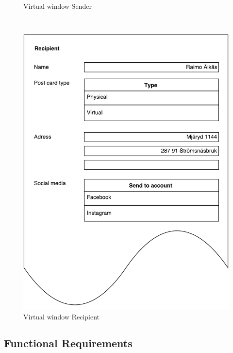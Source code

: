 \documentclass[10pt,a4paper]{article}
\begin{document}
\begin{centering}
\begin{figure}[!ht]
\begin{minipage}{0.3\textwidth}
\caption{Virtual window Sender}
\label{fig:virtualwindows_sender}
\end{minipage}\hfill
~
\begin{minipage}{0.3\textwidth}
\includegraphics[width=\linewidth]{Data_figures/virtualwindows_recipient.pdf}
\caption{Virtual window Recipient}
\label{fig:virtualwindows_recipient}
\end{minipage}

\end{figure}
\end{centering}

\subsection{Functional Requirements}
\end{document}
